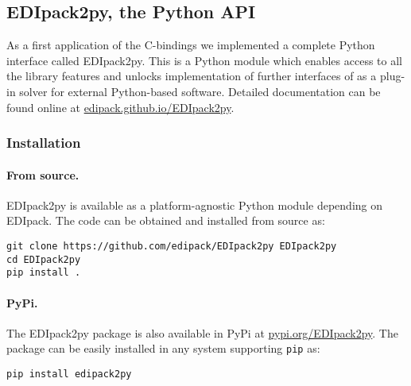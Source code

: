 \documentclass[edipack_sp.tex]{subfiles}
\begin{document}




\subsection{EDIpack2py, the Python API}\label{sSecInteropEDIpy}
As a first application of the \NAME C-bindings we implemented a
complete Python interface called EDIpack2py. This is a Python module which
enables access to all the library features and unlocks implementation of
further interfaces of \NAME as a plug-in solver for external Python-based software. Detailed documentation can be found online at \href{https://edipack.github.io/EDIpack2py}
{edipack.github.io/EDIpack2py}.


\subsubsection{Installation}\label{sSecInteropEDIpyInstallation}
\paragraph{From source.}
EDIpack2py is available as a platform-agnostic Python module depending on EDIpack.
The code can be obtained and installed from source as:
\begin{lstlisting}[style=mybash]
git clone https://github.com/edipack/EDIpack2py EDIpack2py
cd EDIpack2py
pip install . 
\end{lstlisting}

\paragraph{PyPi.}
The EDIpack2py package is also available in PyPi at
\href{https://pypi.org/project/EDIpack2py/}{pypi.org/EDIpack2py}. The package can be easily installed in any system supporting {\tt pip} as:

\begin{lstlisting}[style=mybash]
pip install edipack2py
\end{lstlisting}

\end{document}
